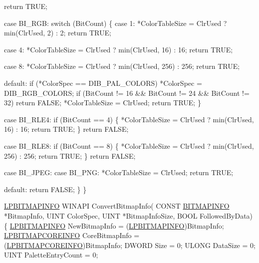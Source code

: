 \begin{DoxyCodeInclude}
        \textcolor{keywordflow}{return} TRUE;

    \textcolor{keywordflow}{case} BI\_RGB:
        \textcolor{keywordflow}{switch} (BitCount)
        \{
        \textcolor{keywordflow}{case} 1:
            *ColorTableSize = ClrUsed ? min(ClrUsed, 2) : 2;
            \textcolor{keywordflow}{return} TRUE;

        \textcolor{keywordflow}{case} 4:
            *ColorTableSize = ClrUsed ? min(ClrUsed, 16) : 16;
            \textcolor{keywordflow}{return} TRUE;

        \textcolor{keywordflow}{case} 8:
            *ColorTableSize = ClrUsed ? min(ClrUsed, 256) : 256;
            \textcolor{keywordflow}{return} TRUE;

        \textcolor{keywordflow}{default}:
            \textcolor{keywordflow}{if} (*ColorSpec == DIB\_PAL\_COLORS)
                *ColorSpec = DIB\_RGB\_COLORS;
            \textcolor{keywordflow}{if} (BitCount != 16 && BitCount != 24 && BitCount != 32)
                \textcolor{keywordflow}{return} FALSE;
            *ColorTableSize = ClrUsed;
            \textcolor{keywordflow}{return} TRUE;
        \}

    \textcolor{keywordflow}{case} BI\_RLE4:
        \textcolor{keywordflow}{if} (BitCount == 4)
        \{
            *ColorTableSize = ClrUsed ? min(ClrUsed, 16) : 16;
            \textcolor{keywordflow}{return} TRUE;
        \}
        \textcolor{keywordflow}{return} FALSE;

    \textcolor{keywordflow}{case} BI\_RLE8:
        \textcolor{keywordflow}{if} (BitCount == 8)
        \{
            *ColorTableSize = ClrUsed ? min(ClrUsed, 256) : 256;
            \textcolor{keywordflow}{return} TRUE;
        \}
        \textcolor{keywordflow}{return} FALSE;

    \textcolor{keywordflow}{case} BI\_JPEG:
    \textcolor{keywordflow}{case} BI\_PNG:
        *ColorTableSize = ClrUsed;
        \textcolor{keywordflow}{return} TRUE;

    \textcolor{keywordflow}{default}:
        \textcolor{keywordflow}{return} FALSE;
    \}
\}

\hyperlink{structtag_b_i_t_m_a_p_i_n_f_o}{LPBITMAPINFO} WINAPI
ConvertBitmapInfo(
    CONST \hyperlink{structtag_b_i_t_m_a_p_i_n_f_o}{BITMAPINFO} *BitmapInfo,
    UINT ColorSpec,
    UINT *BitmapInfoSize,
    BOOL FollowedByData)
\{
    \hyperlink{structtag_b_i_t_m_a_p_i_n_f_o}{LPBITMAPINFO} NewBitmapInfo = (\hyperlink{structtag_b_i_t_m_a_p_i_n_f_o}{LPBITMAPINFO})BitmapInfo;
    \hyperlink{struct___b_i_t_m_a_p_c_o_r_e_i_n_f_o}{LPBITMAPCOREINFO} CoreBitmapInfo = (\hyperlink{struct___b_i_t_m_a_p_c_o_r_e_i_n_f_o}{LPBITMAPCOREINFO})BitmapInfo;
    DWORD Size = 0;
    ULONG DataSize = 0;
    UINT PaletteEntryCount = 0;


\end{DoxyCodeInclude}
